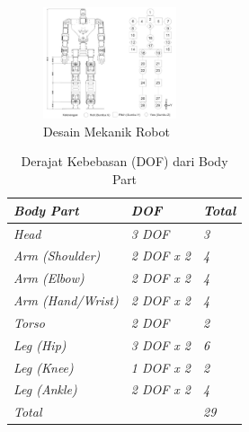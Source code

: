 \begin{enumerate}[label=\Alph*.]
    \begin{figure} [h] \centering
      \includegraphics[width=0.35\textwidth]{gambar/Desain_Mekanik.png}
      \caption{Desain Mekanik Robot}
      \label{fig:Desain_Mekanik}
    \end{figure}

    \begin{table}[htb]
      \centering
      \caption{Derajat Kebebasan (DOF) dari Body Part}
      \begin{tabular}{>{\itshape}l >{\itshape}l >{\itshape}l}
        \toprule
        \textit{Body Part} & \textit{DOF} & \textit{Total} \\
        \midrule
        Head & 3 DOF & 3 \\
        Arm (Shoulder) & 2 DOF x 2 & 4 \\
        Arm (Elbow) & 2 DOF x 2 & 4 \\
        Arm (Hand/Wrist) & 2 DOF x 2 & 4 \\
        Torso & 2 DOF & 2 \\
        Leg (Hip) & 3 DOF x 2 & 6 \\
        Leg (Knee) & 1 DOF x 2 & 2 \\
        Leg (Ankle) & 2 DOF x 2 & 4 \\
        \midrule
        Total & & 29 \\
        \bottomrule
      \end{tabular}
      \label{tab:DOF_Robot}
    \end{table}


\end{enumerate}
